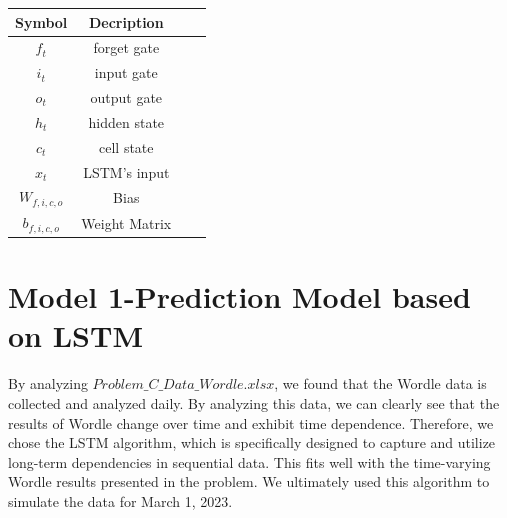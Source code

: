 \documentclass{mcmthesis}  %
\begin{document}
\begin{table}[!h]  %
        \tabcolsep 84pt %
        \begin{tabular*}{\textwidth}{cccc}  %
        \toprule  %
        Symbol & Decription \\
        \midrule  %
        $f_{t}$ & forget gate  \\
        $i_{t}$ & input gate  \\
        $o_{t}$ & output gate  \\
        $h_{t}$ & hidden state  \\
        $c_{t}$ & cell state  \\
        $x_{t}$ & LSTM's input  \\
        $W_{f,i,c,o}$ & Bias  \\
        $b_{f,i,c,o}$ & Weight Matrix \\
        \bottomrule  %
        \end{tabular*}  %
        \end{table}  %
\section{Model 1-Prediction Model based on LSTM}  %

By analyzing \textbf{$Problem\_C\_Data\_Wordle.xlsx$}, we found that the Wordle data is 
collected and analyzed daily. By analyzing this data, we can clearly 
see that the results of Wordle change over time and exhibit time dependence. 
Therefore, we chose the LSTM algorithm, which is specifically designed to 
capture and utilize long-term dependencies in sequential data. This fits 
well with the time-varying Wordle results presented in the problem. We 
ultimately used this algorithm to simulate the data for March 1, 2023.
\end{document}
